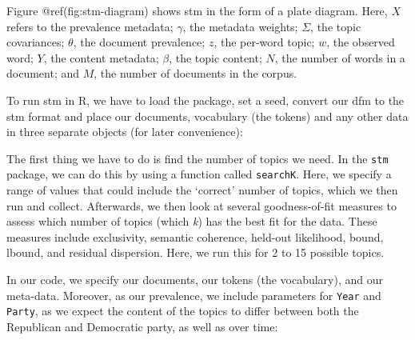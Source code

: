\documentclass[
]{book}
\newenvironment{Shaded}{\begin{snugshade}}{\end{snugshade}}
\newcommand{\AttributeTok}[1]{\textcolor[rgb]{0.13,0.29,0.53}{#1}}
\newcommand{\DecValTok}[1]{\textcolor[rgb]{0.00,0.00,0.81}{#1}}
\newcommand{\FunctionTok}[1]{\textcolor[rgb]{0.13,0.29,0.53}{\textbf{#1}}}
\newcommand{\NormalTok}[1]{#1}
\newcommand{\OtherTok}[1]{\textcolor[rgb]{0.56,0.35,0.01}{#1}}
\newcommand{\SpecialCharTok}[1]{\textcolor[rgb]{0.81,0.36,0.00}{\textbf{#1}}}
\newcommand{\StringTok}[1]{\textcolor[rgb]{0.31,0.60,0.02}{#1}}
\begin{document}
\hfill\break

Figure @ref(fig:stm-diagram) shows stm in the form of a plate diagram. Here, \(X\) refers to the prevalence metadata; \(\gamma\), the metadata weights; \(\Sigma\), the topic covariances; \(\theta\), the document prevalence; \(z\), the per-word topic; \(w\), the observed word; \(Y\), the content metadata; \(\beta\), the topic content; \(N\), the number of words in a document; and \(M\), the number of documents in the corpus.

To run stm in R, we have to load the package, set a seed, convert our dfm to the stm format and place our documents, vocabulary (the tokens) and any other data in three separate objects (for later convenience):

\begin{Shaded}
\end{Shaded}

The first thing we have to do is find the number of topics we need. In the \texttt{stm} package, we can do this by using a function called \texttt{searchK}. Here, we specify a range of values that could include the `correct' number of topics, which we then run and collect. Afterwards, we then look at several goodness-of-fit measures to assess which number of topics (which \emph{k}) has the best fit for the data. These measures include exclusivity, semantic coherence, held-out likelihood, bound, lbound, and residual dispersion. Here, we run this for 2 to 15 possible topics.

In our code, we specify our documents, our tokens (the vocabulary), and our meta-data. Moreover, as our prevalence, we include parameters for \texttt{Year} and \texttt{Party}, as we expect the content of the topics to differ between both the Republican and Democratic party, as well as over time:
\end{document}
